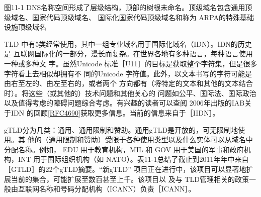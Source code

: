 图11-1
DNS名称空间形成了层级结构，顶部的树根未命名。顶级域名包含通用顶级域名、国家代码顶级域名、
国际化国家代码顶级域名和称为 ARPA的特殊基础设施顶级域名

TLD 中有5类经常使用，其中一组专业域名用于国际化域名（IDN）\footnotemark。IDN的历史是
互联网国际化的一部分，漫长而复杂。在世界各地有多种语言，每种语言使用一种或多种文
字。虽然Unicode 标准［U11］的目标是获取整个字符集，但是很多字符看上去相似却拥有不
同的Unicode 字符值。此外，以文本书写的字符可能是由右至左的、由左至右的，或者两个
方向都有（将特定的文本和其他的文本结合时）。将这些（或其他的）技术问题和其他关心的
问题如公平、国际法、国际政治以及值得考虑的障碍问题综合考虑。有兴趣的读者可以查阅
2006年出版的IAB关于IDN
的回顾\href{https://www.rfc-editor.org/rfc/rfc4690}{[RFC4690]}获取更多信息。当前的信息来自于［IIDN］。

gTLD分为几类：通用、通用限制和赞助。通用gTLD是开放的，可无限制地使用。其
他的（通用限制和赞助）受限于各种使用类型以及什么实体可以从域名中分配名称。例如，
EDU 用于教育机构，MIL 和 GOV 用于美国的军事和政府机构，INT 用于国际组织机构（如
NATO）。表11-1总结了截止到2011年年中来自［GTLD］的22个gTLD摘要。“新gTLD”
项目正在进行中，该项目可以显著地扩展当前的集合，可能扩展至数百甚至上千。该项目以
及与 TLD管理相关的政策一般由互联网名称和号码分配机构（ICANN）负责［ICANN］。

